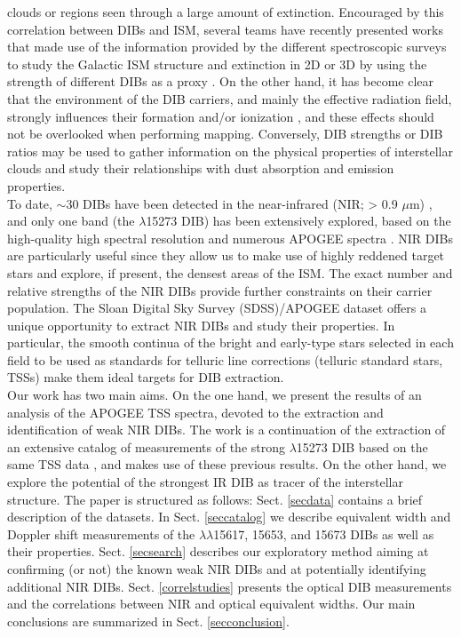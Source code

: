 \documentclass[printer]{aa} %
\begin{document}
clouds or regions seen through a large amount of extinction. Encouraged by this correlation between DIBs and ISM, several teams have recently presented works that made use of the information provided by the different spectroscopic surveys to study the Galactic ISM structure and extinction in 2D or 3D by using the strength of different DIBs as a proxy \citep[e.g.,][]{Munari08,vanLoon13,Yuan14,Kos14,Puspitarini15,vanLoon15,Lan15,Baron15,Farhang15,Bailey16}. 
On the other hand, it has become clear that the environment of the DIB carriers, and mainly the effective radiation field, strongly influences their formation and/or ionization \citep{Krelowski92,Cami97,Cox06,Vos11,Cordiner13}, and these effects should not be overlooked when performing mapping. Conversely, DIB strengths or DIB ratios may be used to gather information on the physical properties of interstellar clouds and study their relationships with dust absorption and emission properties.\\
To date, $\sim$30 DIBs have been detected in the near-infrared (NIR; > 0.9 $\mu$m) \citep{Joblin90,Foing94,Joblin99,Geballe11,Cox14,Hamano15,Hamano16}, and only one band (the $ \lambda$15273 DIB) has been extensively explored, based on the high-quality high spectral resolution and numerous APOGEE spectra \citep{Zasowski15}.
NIR DIBs are particularly useful since they allow us to make use of highly reddened target stars and explore, if present, the densest areas of the ISM.  The exact number and relative strengths of the NIR DIBs provide further constraints on their carrier population. The Sloan Digital Sky Survey (SDSS)/APOGEE dataset offers a unique opportunity to extract NIR DIBs and study their properties. In particular, the smooth continua of the bright and early-type stars selected in each field to be used as standards for telluric line corrections (telluric standard stars, TSSs) make them ideal targets for DIB extraction.\\ 
Our work has two main aims. On the one hand, we present the results of an analysis of the APOGEE TSS spectra, devoted to the extraction and identification of weak NIR DIBs. The work is a continuation of the extraction of an extensive catalog of measurements of the strong $\lambda$15273 DIB based on the same TSS data \citep{Elyajouri16}, and makes use of these previous results. On the other hand, we explore the potential of the strongest IR DIB as tracer of the interstellar structure. The paper is structured as follows:
Sect. \ref{secdata} contains a brief description of the datasets. In Sect. \ref{seccatalog} we describe equivalent width and Doppler shift measurements of the $\lambda\lambda$15617, 15653, and 15673 DIBs as well as their properties. Sect. \ref{secsearch} describes our exploratory method aiming at confirming (or not) the known weak NIR DIBs and at potentially identifying additional NIR DIBs.  Sect. \ref{correlstudies} presents the optical DIB measurements and the correlations between NIR and optical equivalent widths. 
Our main conclusions are summarized in Sect. \ref{secconclusion}.
\end{document}
